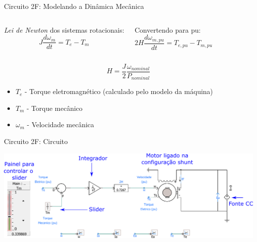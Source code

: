 \begin{frame}{Circuito 2F: Modelando a Dinâmica Mecânica}
\centering


\begin{columns}


{\it Lei de Newton} dos sistemas rotacionais:
\begin{equation*}
J \frac{d \omega_m}{dt} = T_e - T_m 
\end{equation*}




Convertendo para pu: 
\begin{equation*}
2 H \frac{d \omega_{m,pu}}{dt}  = T_{e,pu} - T_{m,pu} 
\end{equation*}




\end{columns}

\begin{equation*}
H = \frac{J}{2}  \frac{\omega_{nominal}}{P_{nominal}}
\end{equation*}

\begin{itemize}
\item $T_e$ - Torque eletromagnético (calculado pelo modelo da máquina)
\item $T_m$ - Torque mecânico 
\item $\omega_m$ - Velocidade mecânica
\end{itemize}

\end{frame}







\begin{frame}{Circuito 2F: Circuito}
\centering

\includegraphics[width=0.9\linewidth]{./figuras/Segundo-Circuito/SIM2f}

\end{frame}